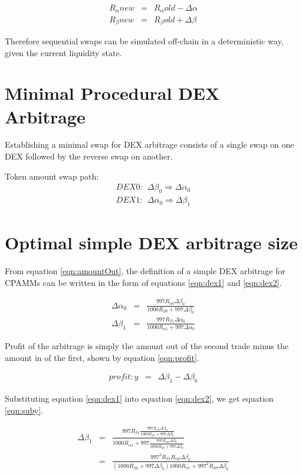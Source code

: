 \documentclass[runningheads]{llncs}
\begin{document}
\begin{eqnarray}
	R_{\alpha}{new}  &=& R_{\alpha}{old} - \Delta\alpha  \label{eqn:reserveA}\\
	R_{\beta}{new}  &=& R_{\beta}{old} + \Delta\beta  \label{eqn:reserveB}
\end{eqnarray}

Therefore sequential swaps can be simulated off-chain in a deterministic way, given the current liquidity state.

\section{Minimal Procedural DEX Arbitrage}
Establishing a minimal swap for DEX arbitrage consists of a single swap on one DEX followed by the reverse swap on another.

Token amount swap path:
\begin{eqnarray}
	DEX0: \: \: \Delta\beta_{0} \Rightarrow \Delta\alpha_{0}\\
	DEX1: \: \: \Delta\alpha_{0} \Rightarrow \Delta\beta_{1}
\end{eqnarray}

\section{Optimal simple DEX arbitrage size}
From equation \ref{eqn:amountOut}, the definition of a simple DEX arbitrage for CPAMMs can be written in the form of equations \ref{eqn:dex1} and \ref{eqn:dex2}.

\begin{eqnarray}
	\Delta\alpha_{0}  &=& \frac{997 R_{\alpha 0} \Delta\beta_{0} }{1000 R_{\beta 0} + 997 \Delta\beta_{0}} \label{eqn:dex1}\\
	\Delta\beta_{1}  &=& \frac{997 R_{\beta 1} \Delta\alpha_{0} }{1000 R_{\alpha 1} + 997 \Delta\alpha_{0}} \label{eqn:dex2}
\end{eqnarray}

Profit of the arbitrage is simply the amount out of the second trade minus the amount in of the first, shown by equation \ref{eqn:profit}.

\begin{eqnarray}
	profit: y  &=& \Delta\beta_{1} - \Delta\beta_{0} \label{eqn:profit}
\end{eqnarray}


Substituting equation \ref{eqn:dex1} into equation \ref{eqn:dex2}, we get equation \ref{eqn:suby}.

\begin{eqnarray}
	\Delta\beta_{1}  &=& \frac{997 R_{\beta 1} \frac{997 R_{\alpha 0} \Delta\beta_{0} }{1000 R_{\beta 0} + 997 \Delta\beta_{0}} }{1000 R_{\alpha 1} + 997 \frac{997 R_{\alpha 0} \Delta\beta_{0} }{1000 R_{\beta 0} + 997 \Delta\beta_{0}}} \label{eqn:suby}\\
	&=& \frac{997^2 R_{\beta 1}  R_{\alpha 0} \Delta\beta_{0} }{(1000 R_{\beta 0} + 997 \Delta\beta_{0}) 1000 R_{\alpha 1} + 997^2 R_{\alpha 0} \Delta\beta_{0} } \label{eqn:subyMore}
\end{eqnarray}
\end{document}
